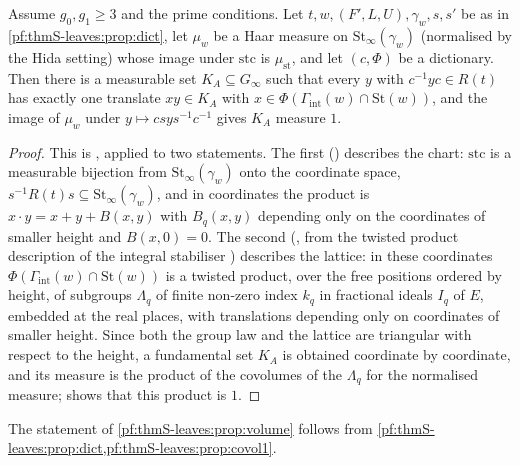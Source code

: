 \begin{proposition}\label{pf:thmS-leaves:prop:covol1}
Assume $g_0,g_1\ge3$ and the prime conditions. Let $t,w,(F',L,U),\gamma_w,s,s'$ be as in \cref{pf:thmS-leaves:prop:dict}, let $\mu_w$ be a Haar measure on
$\mathrm{St}_\infty(\gamma_w)$ (normalised by the Hida setting) whose image under $\mathrm{stc}$ is $\mu_{\mathrm{st}}$, and let $(c,\Phi)$ be a dictionary. Then
there is a measurable set $K_A\subseteq G_\infty$ such that every $y$ with $c^{-1}yc\in R(t)$ has exactly one translate $xy\in K_A$ with
$x\in\Phi(\Gamma_{\mathrm{int}}(w)\cap\mathrm{St}(w))$, and the image of $\mu_w$ under $y\mapsto csys^{-1}c^{-1}$ gives $K_A$ measure $1$.
\end{proposition}

\begin{proof}
This is , applied to two statements. The first
() describes the chart: $\mathrm{stc}$ is a measurable bijection from $\mathrm{St}_\infty(\gamma_w)$ onto the
coordinate space, $s^{-1}R(t)s\subseteq\mathrm{St}_\infty(\gamma_w)$, and in coordinates the product is $x\cdot y=x+y+B(x,y)$ with $B_q(x,y)$ depending only on
the coordinates of smaller height and $B(x,0)=0$. The second
(, from the twisted product description of the
integral stabiliser ) describes the lattice: in these coordinates
$\Phi(\Gamma_{\mathrm{int}}(w)\cap\mathrm{St}(w))$ is a twisted product, over the free positions ordered by height, of subgroups $\Lambda_q$ of finite
non-zero index $k_q$ in fractional ideals $I_q$ of $E$, embedded at the real places, with translations depending only on coordinates of
smaller height. Since both the group law and the lattice are triangular with respect to the height, a fundamental set $K_A$ is
obtained coordinate by coordinate, and its measure is the product of the covolumes of the $\Lambda_q$ for the normalised measure;
 shows that this product is $1$.
\end{proof}

\begin{proposition}\label{pf:thmS-leaves:prop:volgen}
The statement of \cref{pf:thmS-leaves:prop:volume} follows from \cref{pf:thmS-leaves:prop:dict,pf:thmS-leaves:prop:covol1}.
\end{proposition}


